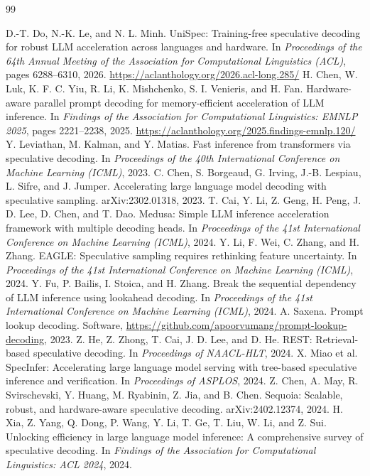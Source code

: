 \documentclass[11pt,a4paper]{article}
\begin{document}
\begin{thebibliography}{99}
\small
{} D.-T. Do, N.-K. Le, and N. L. Minh. UniSpec: Training-free speculative decoding for robust LLM acceleration across languages and hardware. In \emph{Proceedings of the 64th Annual Meeting of the Association for Computational Linguistics (ACL)}, pages 6288--6310, 2026. \url{https://aclanthology.org/2026.acl-long.285/}
 H. Chen, W. Luk, K. F. C. Yiu, R. Li, K. Mishchenko, S. I. Venieris, and H. Fan. Hardware-aware parallel prompt decoding for memory-efficient acceleration of LLM inference. In \emph{Findings of the Association for Computational Linguistics: EMNLP 2025}, pages 2221--2238, 2025. \url{https://aclanthology.org/2025.findings-emnlp.120/}
 Y. Leviathan, M. Kalman, and Y. Matias. Fast inference from transformers via speculative decoding. In \emph{Proceedings of the 40th International Conference on Machine Learning (ICML)}, 2023.
 C. Chen, S. Borgeaud, G. Irving, J.-B. Lespiau, L. Sifre, and J. Jumper. Accelerating large language model decoding with speculative sampling. arXiv:2302.01318, 2023.
 T. Cai, Y. Li, Z. Geng, H. Peng, J. D. Lee, D. Chen, and T. Dao. Medusa: Simple LLM inference acceleration framework with multiple decoding heads. In \emph{Proceedings of the 41st International Conference on Machine Learning (ICML)}, 2024.
 Y. Li, F. Wei, C. Zhang, and H. Zhang. EAGLE: Speculative sampling requires rethinking feature uncertainty. In \emph{Proceedings of the 41st International Conference on Machine Learning (ICML)}, 2024.
 Y. Fu, P. Bailis, I. Stoica, and H. Zhang. Break the sequential dependency of LLM inference using lookahead decoding. In \emph{Proceedings of the 41st International Conference on Machine Learning (ICML)}, 2024.
 A. Saxena. Prompt lookup decoding. Software, \url{https://github.com/apoorvumang/prompt-lookup-decoding}, 2023.
 Z. He, Z. Zhong, T. Cai, J. D. Lee, and D. He. REST: Retrieval-based speculative decoding. In \emph{Proceedings of NAACL-HLT}, 2024.
 X. Miao et al. SpecInfer: Accelerating large language model serving with tree-based speculative inference and verification. In \emph{Proceedings of ASPLOS}, 2024.
 Z. Chen, A. May, R. Svirschevski, Y. Huang, M. Ryabinin, Z. Jia, and B. Chen. Sequoia: Scalable, robust, and hardware-aware speculative decoding. arXiv:2402.12374, 2024.
 H. Xia, Z. Yang, Q. Dong, P. Wang, Y. Li, T. Ge, T. Liu, W. Li, and Z. Sui. Unlocking efficiency in large language model inference: A comprehensive survey of speculative decoding. In \emph{Findings of the Association for Computational Linguistics: ACL 2024}, 2024.

\end{thebibliography}
\end{document}
